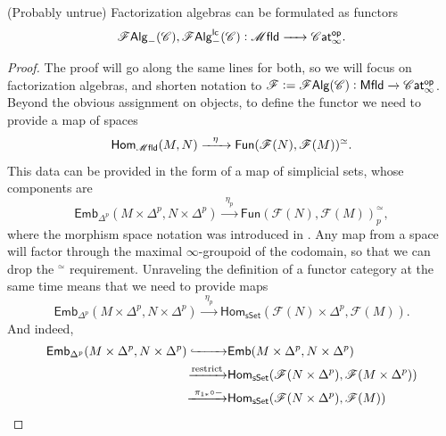 \documentclass[../text]{subfiles}
\begin{document}
\begin{proposition}
    {\color{red} (Probably untrue)} Factorization algebras can be formulated as functors
    \begin{equation}
        \falg_{-}(\catC), \lcfa_{-}(\catC): \mfld \xrightarrow{\ \ \ \ } \cat^{\mathsf{op}}.
    \end{equation}
\end{proposition}

\begin{proof}
    The proof will go along the same lines for both, so we will focus on factorization algebras, and shorten notation to $\mathscr{F} := \falg (\catC): \mfld[r] \xrightarrow{} \cat^{\mathsf{op}}$. Beyond the obvious assignment on objects, to define the functor we need to provide a map of spaces
    \begin{equation}
        \mathsf{Hom}_{\mfld}(M, N) \xrightarrow{\ \ \eta \ \ } \mathsf{Fun}(\mathscr{F}(N), \mathscr{F}(M))^{\simeq}.
    \end{equation}
    This data can be provided in the form of a map of simplicial sets, whose components are
    \begin{equation}
        \mathsf{Emb}_{\Delta^p}(M \times \Delta^p, N \times \Delta^p) \xrightarrow{\ \ \eta_p \ \ } \mathsf{Fun}(\mathscr{F}(N), \mathscr{F}(M))^{\simeq}_p,
    \end{equation}
    where the morphism space notation was introduced in . Any map from a space will factor through the maximal $\infty$-groupoid of the codomain, so that we can drop the $^{\simeq}$ requirement. Unraveling the definition of a functor category at the same time means that we need to provide maps
    \begin{equation}
        \mathsf{Emb}_{\Delta^p}(M \times \Delta^p, N \times \Delta^p) \xrightarrow{\ \ \eta_p \ \ } \mathsf{Hom}_{\mathsf{sSet}}(\mathscr{F}(N) \times \Delta^p, \mathscr{F}(M)).
    \end{equation}
    And indeed,
    \begin{align}
        \mathsf{Emb}_{\Delta^p}(M \times \Delta^p, N \times \Delta^p) \xhookrightarrow{\ \ \ \ \ \ \ }& \mathsf{Emb}(M \times \Delta^p, N \times \Delta^p) \\
        \xrightarrow{\mathrm{restrict}}& \mathsf{Hom_{sSet}} (\mathscr{F}(N \times \Delta^p), \mathscr{F}(M \times \Delta^p)) \\
        \xrightarrow{\ \pi_{1*} \circ -}& \mathsf{Hom_{sSet}} (\mathscr{F}(N \times \Delta^p) , \mathscr{F}(M)) \\

\end{align}
\end{proof}
\end{document}
